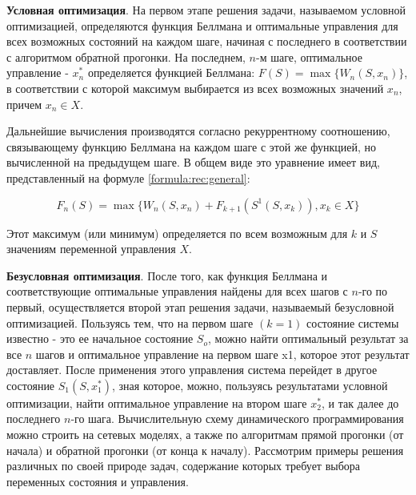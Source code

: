\textbf{Условная оптимизация}. На первом этапе решения задачи, называемом условной оптимизацией, определяются функция Беллмана и оптимальные управления для всех возможных состояний на каждом шаге, начиная с последнего в соответствии с алгоритмом обратной прогонки. На последнем, $n$-м шаге, оптимальное управление - $x^*_n$ определяется функцией Беллмана: $F(S) = \max \{W_n (S, x_n)\}$, в соответствии с которой максимум выбирается из всех возможных значений $x_n$, причем $x_n \in X$.

Дальнейшие вычисления производятся согласно рекуррентному соотношению, связывающему функцию Беллмана на каждом шаге с этой же функцией, но вычисленной на предыдущем шаге. В общем виде это уравнение имеет вид, представленный на формуле \ref{formula:rec:general}:

\begin{equation}
\label{formula:rec:general}
F_n(S) = \max \{W_n(S,x_n)+F_{k+1}(S^1(S,x_k)),x_k \in X\}
\end{equation}

Этот максимум (или минимум) определяется по всем возможным для $k$ и $S$ значениям переменной управления $X$.

\textbf{Безусловная оптимизация}. После того, как функция Беллмана и соответствующие оптимальные управления найдены для всех шагов с $n$-го по первый, осуществляется второй этап решения задачи, называемый безусловной оптимизацией. Пользуясь тем, что на первом шаге $(k = 1)$ состояние системы известно - это ее начальное состояние $S_o$, можно найти оптимальный результат за все $n$ шагов и оптимальное управление на первом шаге x1, которое этот результат доставляет. После применения этого управления система перейдет в другое состояние $S_1(S,x^*_1)$, зная которое, можно, пользуясь результатами условной оптимизации, найти оптимальное управление на втором шаге $x^*_2$, и так далее до последнего $n$-го шага. Вычислительную схему динамического программирования можно строить на сетевых моделях, а также по алгоритмам прямой прогонки (от начала) и обратной прогонки (от конца к началу). Рассмотрим примеры решения различных по своей природе задач, содержание которых требует выбора переменных состояния и управления.